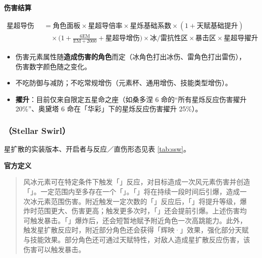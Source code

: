 \indent\textbf{伤害结算} 

\[
\begin{aligned}
\text{星超导伤害} &= \text{角色面板} \times \text{星超导倍率} \times \text{星烁基础系数} \times (1 + \text{天赋基础提升}) \\
&\quad \times \Big(1 + \frac{6\text{EM}}{\text{EM}+2000} + \text{星超导增伤}\Big) \times \text{冰/雷抗性区} \times \text{暴击区} \times \text{星超导擢升}
\end{aligned}
\]

\begin{itemize}
\item 伤害元素属性随\textbf{造成伤害的角色}而定（冰角色打出冰伤、雷角色打出雷伤），伤害数字颜色随之变化。
\item 不吃防御与减防；不吃常规增伤（元素杯、通用增伤、技能类型增伤）。
\item \textbf{擢升}：目前仅来自限定五星命之座（如桑多涅 6 命的“所有星烁反应伤害擢升 20\%”、奥黛塔 6 命在「华彩」下的星烁反应伤害擢升 25\%）。
\end{itemize}

\subsubsection{（Stellar Swirl）}\label{sec:ssw}

星扩散的实装版本、开启者与反应／直伤形态见表 \ref{tab:ssw}。

\indent\textbf{官方定义} 

\begin{quote}
风冰元素可在特定条件下触发「」反应，对目标造成一次风元素伤害并创造「」。一定范围内至多存在一个「」。「」将在持续一段时间后引爆，造成一次冰元素范围伤害。附近触发一定次数的「」反应后，「」将提升等级，爆炸时范围更大、伤害更高；触发更多次时，「」还会提前引爆。上述伤害均可触发暴击。「」爆炸后，还会短暂地赋予附近角色一次高跳能力。此外，触发星扩散反应时，附近部分角色还会获得「辉映·」效果，强化部分天赋与技能效果。部分角色还可通过天赋特性，对敌人造成星扩散反应伤害，该伤害可以触发暴击。
\end{quote}

